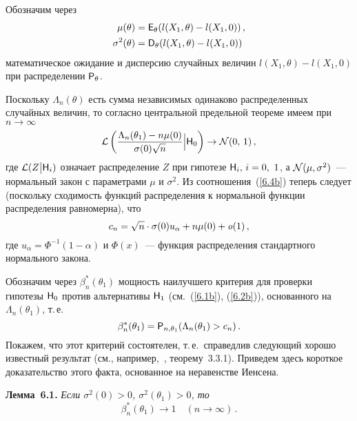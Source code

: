 \begin{multicols}{2}
%

Обозначим через
\begin{align}
\mu(\theta) &= {\e}_{\theta}(l(X_1,\theta)-l(X_1,0))\,,\label{6.5b}\\
\sigma^2(\theta)& = {\D}_{\theta}(l(X_1,\theta)-l(X_1,0))%
\notag
\end{align}
математическое ожидание и дисперсию случайных величин
$l(X_1,\theta)-l(X_1,0)$ при распределении ${{\sf P}}_{\theta}$.

Поскольку $\Lambda_n(\theta)$ есть сумма независимых одинаково
распределенных случайных величин, то согласно центральной предельной
теореме имеем при $n\to\infty$
\begin{equation}
{\cal L}\left( \displaystyle\frac{\displaystyle \Lambda_n(\theta_1)-n\mu(0)\mathstrut}{\displaystyle \sigma(0)\sqrt{n}\mathstrut}
\Bigl|{\sf H}_0\right )\to{\cal N}(0,\,1)\,, \label{6.7b}
\end{equation}
где ${\cal L}(Z\bigl|{\sf H}_i)$ означает распределение $Z$ при
гипотезе ${\sf H}_i,\,i = 0,\ 1$, а ${\cal N}(\mu,\sigma^2)$~---
нормальный закон с параметрами $\mu$ и $\sigma^2$. Из соотношения~(\ref{6.4b})
теперь следует (поскольку сходимость функций
распределения к нормальной функции распределения равномерна), что
\begin{equation}
c_n = \sqrt{n}\cdot \sigma(0)u_{\alpha}+n\mu(0)+{\it o}(1)\,,
\label{6.8b}
\end{equation}
где $u_{\alpha} = \Phi^{-1}(1-\alpha)$ и $\Phi(x)$~--- функция
распределения стандартного нормального закона.

Обозначим через $\beta_n^*(\theta_1)$ мощность наилучшего критерия
для проверки гипотезы ${\sf H}_0$ против альтернативы ${\sf H}_1$
(см.~(\ref{6.1b}), (\ref{6.2b})), основанного на $\Lambda_n(\theta_1)$, т.\,е.\
\begin{equation*}
\beta_n^*(\theta_1) = {{\sf P}}_{n,\theta_1}(\Lambda_n(\theta_1)>
c_n)\,.
\end{equation*}
Покажем, что этот критерий состоятелен, т.\,е.\ справедлив
следующий хорошо известный результат (см., например,~\cite{16be},
теорему~3.3.1). Приведем здесь короткое доказательство этого факта,
основанное на неравенстве Иенсена.

\medskip
\noindent
{\bf Лемма~6.1.} {\it Если $\sigma^2(0)>0$, $\sigma^2(\theta_1)>0$,
то
$$
\beta_n^*(\theta_1)\to 1\quad (n \to \infty)\,.
$$
}

\medskip


\end{multicols}
